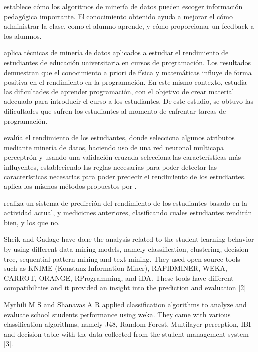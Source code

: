 \textcite{merceron2005educational} establece cómo los algoritmos de minería de datos pueden escoger información pedagógica importante. El conocimiento obtenido ayuda a mejorar el cómo administrar la clase, como el alumno aprende, y cómo proporcionar un feedback a los alumnos. 

\textcite{akinola2012data} aplica técnicas de minería de datos aplicados a estudiar el rendimiento de estudiantes de educación universitaria en cursos de programación. Los resultados demuestran que el conocimiento a priori de física y matemáticas influye de forma positiva en el rendimiento en la programación. En este mismo contexto, \textcite{lahtinen2005study} estudia las dificultades de aprender programación, con el objetivo de crear material adecuado para introducir el curso a los estudiantes. De este estudio, se obtuvo las dificultades que sufren los estudiantes al momento de enfrentar tareas de programación.

\textcite{borkar2014attributes} evalúa el rendimiento de los estudiantes, donde selecciona algunos atributos mediante minería de datos, haciendo uso de una red neuronal multicapa perceptrón y usando una validación cruzada selecciona las características más influyentes, estableciendo las reglas necesarias para poder detectar las características necesarias para poder predecir el rendimiento de los estudiantes. \textcite{jayakameswaraiah2014study} aplica los mismos métodos propuestos por \textcite{borkar2014attributes}.

\textcite{abdullah2014students} realiza un sistema de predicción del rendimiento de los estudiantes basado en la actividad actual, y mediciones anteriores, clasificando cuales estudiantes rendirán bien, y los que no. 

Sheik and Gadage have done the analysis related to the student learning behavior by using different data mining models, namely classification, clustering, decision tree, sequential pattern mining and text mining. They used open source tools such as KNIME (Konstanz Information Miner), RAPIDMINER, WEKA, CARROT, ORANGE, RProgramming, and iDA. These tools have different compatibilities and it provided an insight into the prediction and evaluation [2]

Mythili M S and Shanavas A R applied classification algorithms to analyze and evaluate school students performance using weka. They came with various classification algorithms, namely J48, Random Forest, Multilayer perception, IBI and decision table with the data collected from the student management system [3]. 

